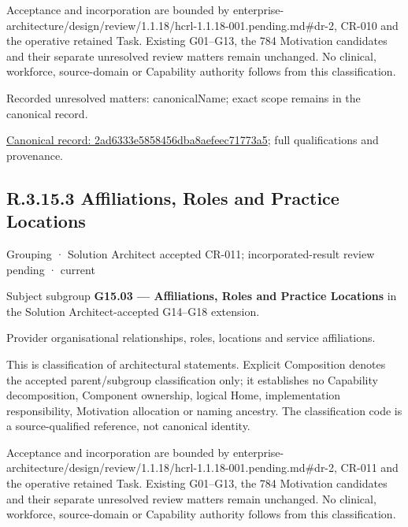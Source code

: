 Acceptance and incorporation are bounded by enterprise-architecture/design/review/1.1.18/hcrl-1.1.18-001.pending.md\#dr-2, CR-010 and the operative retained Task. Existing G01–G13, the 784 Motivation candidates and their separate unresolved review matters remain unchanged. No clinical, workforce, source-domain or Capability authority follows from this classification.


{\small Recorded unresolved matters: canonicalName; exact scope remains in the canonical record.}\par
{\footnotesize \href{../../../../continuum/grouping/2ad6333e5858456dba8aefeec71773a5.md}{Canonical record: 2ad6333e5858456dba8aefeec71773a5}; full qualifications and provenance.}\par
\subsection*{R.3.15.3 Affiliations, Roles and Practice Locations}
\label{navigation:R.3.15.3}

\label{element:25a15d4bea2d418d918e3a7e01d9fcbf}
{\small Grouping · Solution Architect accepted CR-011; incorporated-result review pending · current}\par

Subject subgroup \textbf{G15.03 — Affiliations, Roles and Practice Locations} in the Solution Architect-accepted G14–G18 extension.



Provider organisational relationships, roles, locations and service affiliations.



This is classification of architectural statements. Explicit Composition denotes the accepted parent/subgroup classification only; it establishes no Capability decomposition, Component ownership, logical Home, implementation responsibility, Motivation allocation or naming ancestry. The classification code is a source-qualified reference, not canonical identity.



Acceptance and incorporation are bounded by enterprise-architecture/design/review/1.1.18/hcrl-1.1.18-001.pending.md\#dr-2, CR-011 and the operative retained Task. Existing G01–G13, the 784 Motivation candidates and their separate unresolved review matters remain unchanged. No clinical, workforce, source-domain or Capability authority follows from this classification.


